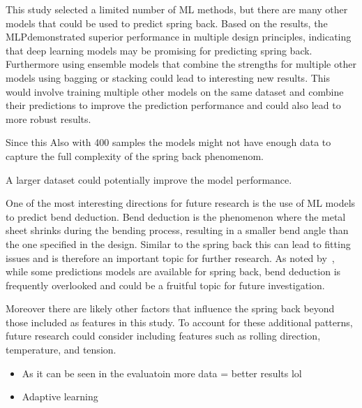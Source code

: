 This study selected a limited number of \ac{ML} methods, but there are many other models that could be used to
predict spring back.
Based on the results, the \ac{MLP}demonstrated superior performance in multiple design principles, indicating that
deep learning models may be promising for predicting spring back.
Furthermore using ensemble models that combine the strengths for multiple other models using bagging or stacking could
lead to interesting new results.
This would involve training multiple other models on the same dataset and combine their predictions to improve the
prediction performance and could also lead to more robust results.

Since this Also with 400 samples the models might not have enough data to capture the full complexity of the spring back
phenomenom.

A larger dataset could potentially improve the model performance.

One of the most interesting directions for future research is the use of \ac{ML} models to predict bend deduction.
Bend deduction is the phenomenon where the metal sheet shrinks during the bending process, resulting in a smaller
bend angle than the one specified in the design.
Similar to the spring back this can lead to fitting issues and is therefore an important topic for further research.
As noted by~\cite{strano2017fusion}, while some predictions models are available for spring back, bend deduction is
frequently overlooked and could be a fruitful topic for future investigation.

Moreover there are likely other factors that influence the spring back beyond those included as features in this study.
To account for these additional patterns, future research could consider including features such as rolling
direction, temperature, and tension.

\begin{itemize}
    \item As it can be seen in the evaluatoin more data = better results lol
    \item Adaptive learning
\end{itemize}



